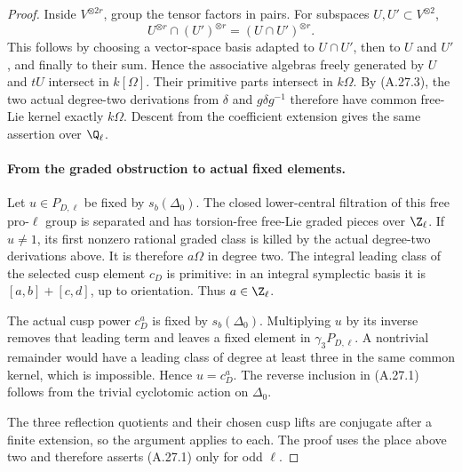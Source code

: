 \begin{proof}
Inside $V^{\otimes 2r}$, group the tensor factors in
pairs. For subspaces $U,U'\subset V^{\otimes2}$,
\[
                  U^{\otimes r}\cap(U')^{\otimes r}
                            =(U\cap U')^{\otimes r}.
                                                        \tag{A.27.15}
\]
This follows by choosing a vector-space basis adapted
to $U\cap U'$, then to $U$ and $U'$, and finally to
their sum. Hence the associative algebras freely
generated by $U$ and $tU$ intersect in $k[\Omega]$.
Their primitive parts intersect in $k\Omega$.
By (A.27.3), the two actual degree-two derivations
from $\delta$ and $g\delta g^{-1}$ therefore have
common free-Lie kernel exactly $k\Omega$.
Descent from the coefficient extension gives the
same assertion over $\Q_\ell$.

\paragraph{From the graded obstruction to actual fixed elements.}
Let $u\in P_{D,\ell}$ be fixed by $s_b(\Delta_0)$.
The closed lower-central filtration of this free
pro-$\ell$ group is separated and has torsion-free
free-Lie graded pieces over $\Z_\ell$. If $u\ne1$,
its first nonzero rational graded class is killed
by the actual degree-two derivations above. It is
therefore $a\Omega$ in degree two. The integral
leading class of the selected cusp element $c_D$
is primitive: in an integral symplectic basis it
is $[a,b]+[c,d]$, up to orientation. Thus $a\in\Z_\ell$.

The actual cusp power $c_D^a$ is fixed by
$s_b(\Delta_0)$. Multiplying $u$ by its inverse
removes that leading term and leaves a fixed
element in $\gamma_3P_{D,\ell}$. A nontrivial
remainder would have a leading class of degree
at least three in the same common kernel, which
is impossible. Hence $u=c_D^a$. The reverse
inclusion in (A.27.1) follows from the trivial
cyclotomic action on $\Delta_0$.

The three reflection quotients and their chosen
cusp lifts are conjugate after a finite extension,
so the argument applies to each. The proof uses
the place above two and therefore asserts
(A.27.1) only for odd $\ell$.
\end{proof}
